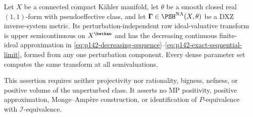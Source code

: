 \begin{corollary}\label{cor:p142-pseudoeffective-raw-usc}
Let $X$ be a connected compact K\"ahler manifold, let $\theta$ be a
smooth closed real $(1,1)$-form with pseudoeffective class, and let
$\boldsymbol\Gamma\in\PSH^{\mathrm{NA}}(X,\theta)$ be a DXZ
inverse-system metric. Its perturbation-independent raw ideal-valuative
transform is upper semicontinuous on $X^{\bethan}$ and has the decreasing
continuous finite-ideal approximation in
\eqref{eq:p142-decreasing-sequence}--\eqref{eq:p142-exact-sequential-limit},
formed from any one perturbation component. Every dense parameter set
computes the same transform at all semivaluations.

This assertion requires neither projectivity nor rationality, bigness,
nefness, or positive volume of the unperturbed class. It asserts no MP
positivity, positive approximation, Monge--Amp\`ere construction, or
identification of $P$-equivalence with $\mathcal I$-equivalence.
\end{corollary}
